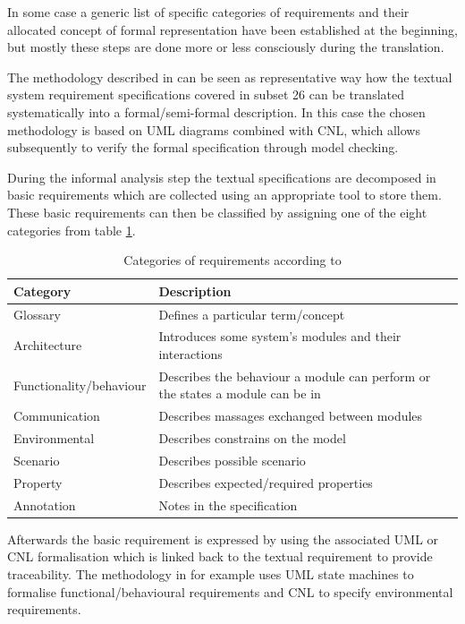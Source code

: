\documentclass{./template/openetcs2}
\begin{document}
In some case a generic list of specific categories of requirements and their allocated concept of formal representation have been established at the beginning, but mostly these steps are done more or less consciously during the translation. 

The methodology described in \citep{Cimatti.2008c} can be seen as representative way how the textual system requirement specifications covered in subset 26 can be translated systematically into a formal/semi-formal description. In this case the chosen methodology is based on UML diagrams combined with CNL, which allows subsequently to verify the formal specification through model checking.

During the informal analysis step the textual specifications are decomposed in basic requirements which are collected using an appropriate tool to store them. These basic requirements can then be classified by assigning one of the eight categories from table \ref{tab:categories of requirements}.

\begin{table}[h]

\caption{Categories of requirements according to \citep{Cimatti.2008c}}
\label{tab:categories of requirements}

\begin{tabular}{|p{4.5cm}|p{9.3cm}|}
\hline
\textbf{Category}  &  \textbf{Description} \\ \hline
Glossary & Defines a particular term/concept \\ \hline
Architecture &  Introduces some system's modules and their interactions \\ \hline
Functionality/behaviour & Describes the behaviour a module can perform or the states a module can be in \\ \hline
Communication &  Describes massages exchanged between modules \\\hline
Environmental &  Describes constrains on the model \\\hline
Scenario & Describes possible scenario \\\hline
Property &  Describes expected/required properties \\\hline
Annotation & Notes in the specification\\
\hline
\end{tabular}

\end{table}

Afterwards the basic requirement is expressed by using the associated UML or CNL formalisation which is linked back to the textual requirement  to provide traceability. The methodology in \citep{Cimatti.2008c} for example uses UML state machines to  formalise  functional/behavioural requirements and CNL to specify environmental requirements. 
\end{document}
